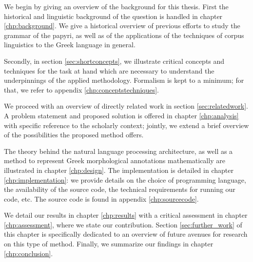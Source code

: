 We begin by giving an overview of the background for this thesis.
First the historical and linguistic background of the question is
handled in chapter \vref{chp:background}. We give a historical overview of
previous efforts to study the grammar of the papyri, as well as of the
applications of the techniques of corpus linguistics to the Greek
language in general.

Secondly, in section \vref{sec:shortconcepts}, we illustrate critical
concepts and techniques for the task at hand which are necessary to
understand the underpinnings of the applied methodology. Formalism is
kept to a minimum; for that, we refer to appendix
\vref{chp:conceptstechniques}.

We proceed with an overview of directly related work in
section \vref{sec:relatedwork}. A problem statement and proposed solution is
offered in chapter \vref{chp:analysis} with specific reference to the
scholarly context; jointly, we extend a brief overview of the
possibilities the proposed method offers.

The theory behind the natural language processing architecture, as
well as a method to represent Greek morphological annotations
mathematically are illustrated in chapter \vref{chp:design}. The
implementation is detailed in chapter \vref{chp:implementation}: we provide
details on the choice of programming language, the availability of the
source code, the technical requirements for running our code, etc. The
source code is found in appendix \vref{chp:sourcecode}.

We detail our results in chapter \vref{chp:results} with a critical
assessment in chapter \vref{chp:assessment}, where we state our
contribution. Section \vref{sec:further_work} of this chapter is
specifically dedicated to an overview of future avenues for research
on this type of method. Finally, we summarize our findings in chapter
\vref{chp:conclusion}.

